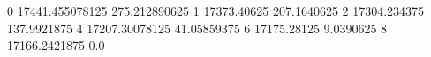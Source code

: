 0 17441.455078125 275.212890625
1 17373.40625 207.1640625
2 17304.234375 137.9921875
4 17207.30078125 41.05859375
6 17175.28125 9.0390625
8 17166.2421875 0.0
